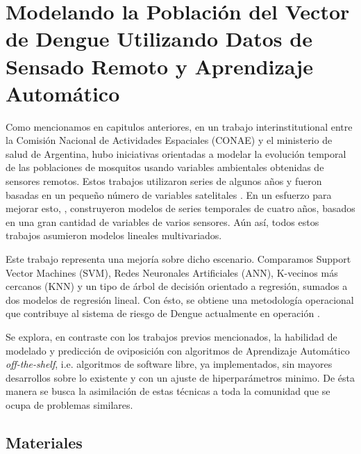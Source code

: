 


\justifying
\chapter{Modelando la Población del Vector de Dengue Utilizando Datos de Sensado Remoto y Aprendizaje Automático}

  \par Como mencionamos en capitulos anteriores, en un trabajo interinstitutional entre
    la Comisión Nacional de Actividades Espaciales (CONAE) y el ministerio de salud
    de Argentina, hubo iniciativas orientadas a modelar la evolución temporal de
    las poblaciones de mosquitos usando variables ambientales obtenidas de
    sensores remotos. Estos trabajos utilizaron series de algunos años y fueron
    basadas en un pequeño número de variables satelitales \cite{ndwi_erffectiveness, modis_data}.
    En un esfuerzo para mejorar esto, \cite{temporal_modeling}, construyeron modelos
    de series temporales de cuatro años, basados en una gran cantidad de variables
    de varios sensores.
    Aún así, todos estos trabajos asumieron modelos lineales multivariados.

  \par Este trabajo representa una mejoría sobre dicho escenario. Comparamos
    Support Vector Machines (SVM), Redes Neuronales Artificiales (ANN),
    K-vecinos más cercanos (KNN) y un tipo de árbol de decisión orientado a
    regresión, sumados a dos modelos de regresión lineal. Con ésto, se
    obtiene una metodología operacional que contribuye al sistema de riesgo
    de Dengue actualmente en operación \cite{porcasi_operative, analisis_cordoba}.

  \par Se explora, en contraste con los trabajos previos mencionados, la habilidad
    de modelado y predicción de oviposición con algoritmos de Aprendizaje
    Automático \textit{off-the-shelf}, i.e. algoritmos de software libre, ya
    implementados, sin mayores desarrollos sobre lo existente y con un ajuste de
    hiperparámetros minimo. De ésta manera se busca la asimilación de estas
    técnicas a toda la comunidad que se ocupa de problemas similares.


\section{Materiales}

